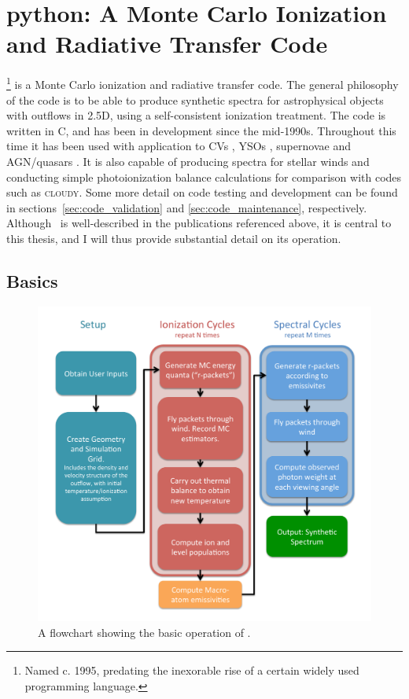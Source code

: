 
\section{{\sc python}: A Monte Carlo Ionization and Radiative Transfer Code}
\label{sec:python}
\py\footnote{Named c. 1995, predating the inexorable rise of a certain widely used
programming language.} is a Monte Carlo ionization and radiative transfer code. 
The general philosophy of the code is to be able to produce synthetic spectra
for astrophysical objects with outflows in 2.5D, using a self-consistent ionization 
treatment. The code is written in C, and has been in development since the mid-1990s.
Throughout this time it has been used with application to CVs \citep[hereafter LK02]{LK02},
YSOs \citep[][hereafter SDL05]{simmacro2005}, supernovae \citep{kerzendorfsim} and AGN/quasars 
\citep[hereafter H13 and H14]{higginbottom2013,H14}. It is also capable of producing spectra 
for stellar winds and conducting simple photoionization balance calculations for
comparison with codes such as \textsc{cloudy}. Some more detail on code testing and 
development can be found in 
sections~\ref{sec:code_validation} and \ref{sec:code_maintenance},
respectively. Although \py\ is well-described in the publications referenced above,
it is central to this thesis, and I will thus provide substantial detail on its operation. 

\subsection{Basics}

\begin{figure}
\centering
\includegraphics[width=1.0\textwidth]{figures/03-radtrans/flowchart.pdf}
\caption
{
A flowchart showing the basic operation of \py.
} 
\label{fig:flowchart}
\end{figure}

